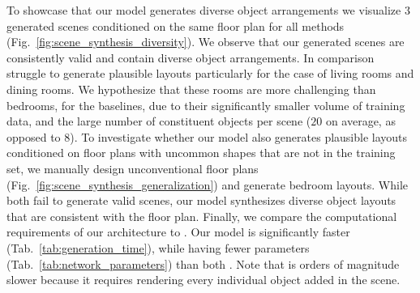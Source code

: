 \documentclass{article}
\newcommand{\figref}[1]{Fig.~\ref{#1}}
\newcommand{\tabref}[1]{Tab.~\ref{#1}}
\begin{document}
To showcase that our model generates diverse object arrangements we
visualize $3$ generated scenes conditioned on the same floor plan for all
methods (\figref{fig:scene_synthesis_diversity}). We observe that our generated
scenes are consistently valid and contain diverse object arrangements. In comparison
\cite{Ritchie2019CVPR, Wang2020ARXIV} struggle to generate plausible layouts
particularly for the case of living rooms and dining rooms. We hypothesize that these rooms are more challenging than bedrooms, for the baselines, due to their significantly smaller volume of training data,
and the large number of constituent objects per scene ($20$ on average, as opposed to $8$).
To investigate whether our model 
also generates plausible layouts conditioned on floor plans with
uncommon shapes that are not in the training set, we manually design unconventional floor plans (\figref{fig:scene_synthesis_generalization}) and generate bedroom layouts.
While both \cite{Ritchie2019CVPR, Wang2020ARXIV} fail to generate valid scenes,
our model synthesizes diverse object layouts that are consistent with the floor plan.
Finally, we compare the computational requirements of our architecture to
\cite{Ritchie2019CVPR, Wang2020ARXIV}. Our model is significantly faster
(\tabref{tab:generation_time}), while having fewer parameters
(\tabref{tab:network_parameters}) than both \cite{Ritchie2019CVPR, Wang2020ARXIV}. Note
that \cite{Ritchie2019CVPR} is orders of magnitude slower because it requires
rendering every individual object added in the scene.
\end{document}
